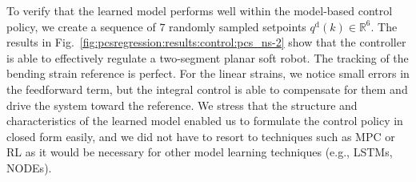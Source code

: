 To verify that the learned model performs well within the model-based control policy, we create a sequence of $7$ randomly sampled setpoints $q^\mathrm{d}(k) \in \mathbb{R}^6$. %
The results in Fig.~\ref{fig:pcsregression:results:control:pcs_ns-2} show that the controller is able to effectively regulate a two-segment planar soft robot.%
The tracking of the bending strain reference is perfect. For the linear strains, we notice small errors in the feedforward term, but the integral control is able to compensate for them and drive the system toward the reference.
We stress that the structure and characteristics of the learned model enabled us to formulate the control policy in closed form easily, and we did not have to resort to techniques such as \gls{MPC} or \gls{RL} as it would be necessary for other model learning techniques (e.g., \glspl{LSTM}, \glspl{NODE}).